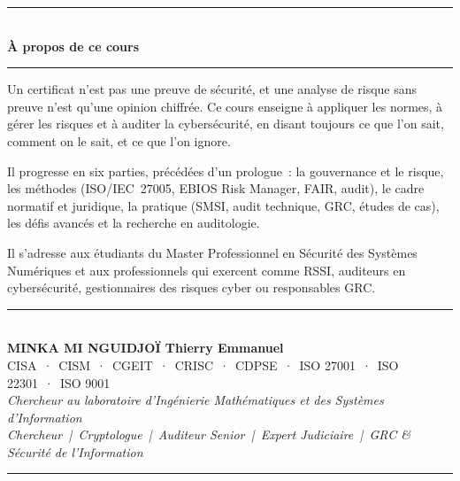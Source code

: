 \documentclass[12pt, twoside, openright, a4paper]{book}
\begin{document}
\vspace*{2.5cm}

\begin{center}
    {\color{CouleurAccent}\rule{0.6\linewidth}{1pt}}\\[1.5ex]
    {\color{white}\Large\bfseries À propos de ce cours}\\[1.5ex]
    {\color{CouleurAccent}\rule{0.6\linewidth}{1pt}}
\end{center}

\vspace{1cm}

\begin{center}
\begin{minipage}{0.75\textwidth}
\color{white!85!gray}
Un certificat n'est pas une preuve de sécurité, et une analyse de risque
sans preuve n'est qu'une opinion chiffrée. Ce cours enseigne à appliquer les
normes, à gérer les risques et à auditer la cybersécurité, en disant toujours
ce que l'on sait, comment on le sait, et ce que l'on ignore.

\medskip

Il progresse en six parties, précédées d'un prologue~: la gouvernance et le
risque, les méthodes (ISO/IEC~27005, EBIOS Risk Manager, FAIR, audit), le cadre
normatif et juridique, la pratique (SMSI, audit technique, GRC, études de
cas), les défis avancés et la recherche en auditologie.

\medskip

Il s'adresse aux étudiants du Master Professionnel en Sécurité des Systèmes
Numériques et aux
professionnels qui exercent comme RSSI, auditeurs en cybersécurité,
gestionnaires des risques cyber ou responsables GRC.
\end{minipage}
\end{center}

\vfill

\begin{center}
    {\color{CouleurAccent}\rule{0.7\linewidth}{1.2pt}}\\[1.2ex]
    {\color{white}\large\bfseries MINKA MI NGUIDJOÏ Thierry Emmanuel}\\[0.4ex]
    {\color{white!80!gray}\small
        CISA~·~CISM~·~CGEIT~·~CRISC~·~CDPSE~·~ISO 27001~·~ISO 22301~·~ISO 9001}\\[0.3ex]
    {\color{white!70!gray}\footnotesize\itshape
        Chercheur au laboratoire d'Ingénierie Mathématiques et des Systèmes d'Information}\\[0.3ex]
    {\color{white!70!gray}\footnotesize\itshape
        Chercheur~|~Cryptologue~|~Auditeur Senior~|~Expert Judiciaire~|~GRC \& Sécurité de l'Information}\\[1.2ex]
    {\color{CouleurAccent}\rule{0.7\linewidth}{1.2pt}}
\end{center}

\vspace{1cm}

\afterpage{\nopagecolor}
\end{document}
